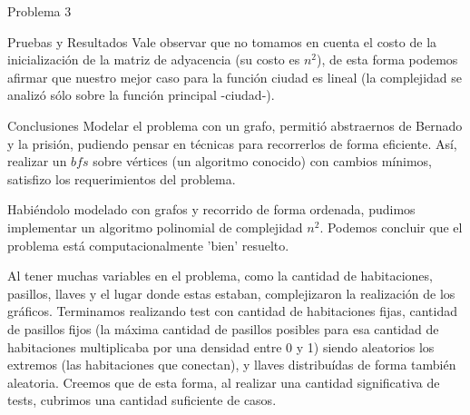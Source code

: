 \begin{section}{Problema 3}
\begin{subsection}{Pruebas y Resultados}
		Vale observar que no tomamos en cuenta el costo de la inicialización de la matriz de adyacencia (su costo es $n^2$), de esta forma podemos afirmar que nuestro mejor caso para la función ciudad es lineal (la complejidad se analizó sólo sobre la función principal -ciudad-).

		
	\end{subsection}

	\begin{subsection}{Conclusiones}
		Modelar el problema con un grafo, permitió abstraernos de Bernado y la prisión, pudiendo pensar en técnicas para recorrerlos de forma eficiente. Así, realizar un $bfs$ sobre vértices (un algoritmo conocido) con cambios mínimos, satisfizo los requerimientos del problema.

		Habiéndolo modelado con grafos y recorrido de forma ordenada, pudimos implementar un algoritmo polinomial de complejidad $n^2$. Podemos concluir que el problema está computacionalmente 'bien' resuelto.

		Al tener muchas variables en el problema, como la cantidad de habitaciones, pasillos, llaves y el lugar donde estas estaban, complejizaron la realización de los gráficos. Terminamos realizando test con cantidad de habitaciones fijas, cantidad de pasillos fijos (la máxima cantidad de pasillos posibles para esa cantidad de habitaciones multiplicaba por una densidad entre 0 y 1) siendo aleatorios los extremos (las habitaciones que conectan), y llaves distribuídas de forma también aleatoria. Creemos que de esta forma, al realizar una cantidad significativa de tests, cubrimos una cantidad suficiente de casos.

	\end{subsection}
\end{section}

